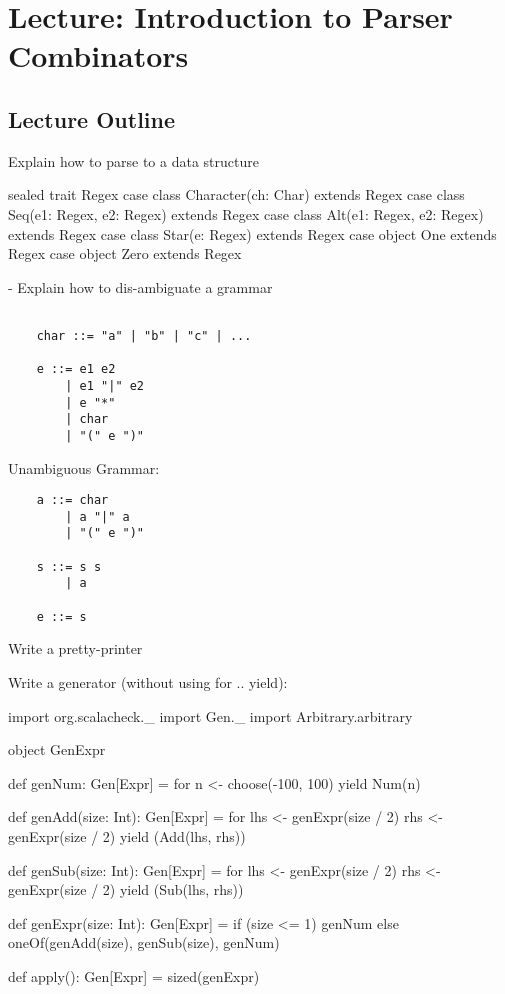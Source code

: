 \startlecture
\chapter{Lecture: Introduction to Parser Combinators}

\begin{instructor}

\section*{Lecture Outline}

Explain how to parse to a data structure

\begin{scalacode}
  sealed trait Regex
  case class Character(ch: Char) extends Regex
  case class Seq(e1: Regex, e2: Regex) extends Regex
  case class Alt(e1: Regex, e2: Regex) extends Regex
  case class Star(e: Regex) extends Regex
  case object One extends Regex
  case object Zero extends Regex
\end{scalacode}

- Explain how to dis-ambiguate a grammar

\begin{verbatim}

    char ::= "a" | "b" | "c" | ...

    e ::= e1 e2
        | e1 "|" e2
        | e "*"
        | char
        | "(" e ")"
\end{verbatim}

Unambiguous Grammar:

\begin{verbatim}
    a ::= char
        | a "|" a
        | "(" e ")"

    s ::= s s
        | a

    e ::= s
\end{verbatim}

Write a pretty-printer


Write a generator (without using for .. yield):

\begin{scalacode}
  import org.scalacheck._
  import Gen._
  import Arbitrary.arbitrary

  object GenExpr {

    def genNum: Gen[Expr] = for {
      n <- choose(-100, 100)
    } yield Num(n)

    def genAdd(size: Int): Gen[Expr] = for {
      lhs <- genExpr(size / 2)
      rhs <- genExpr(size / 2)
    } yield (Add(lhs, rhs))

    def genSub(size: Int): Gen[Expr] = for {
      lhs <- genExpr(size / 2)
      rhs <- genExpr(size / 2)
    } yield (Sub(lhs, rhs))

    def genExpr(size: Int): Gen[Expr] = {
      if (size <= 1) {
        genNum
      }
      else {
        oneOf(genAdd(size), genSub(size), genNum)
      }
    }

    def apply(): Gen[Expr] = sized(genExpr)

  }
\end{scalacode}

\end{instructor}


